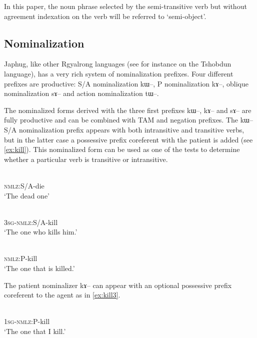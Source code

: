 \documentclass[oldfontcommands,oneside,a4paper,11pt]{article}
\newcommand{\ipa}[1]{{\phon #1}} %
\begin{document}
In this paper, the noun phrase selected by the semi-transitive verb but without agreement indexation on the verb will be referred to `semi-object'.

\subsection{Nominalization} \label{sec:nmlz}

Japhug, like other Rgyalrong languages (see for instance \citealt{jackson03caodeng} on the Tshobdun language), has a very rich system of nominalization prefixes. Four different prefixes are productive:   S/A nominalization \ipa{kɯ--},   P nominalization \ipa{kɤ--},   oblique nominalization \ipa{sɤ--}  and   action nominalization \ipa{tɯ--}.  

 
The nominalized forms derived with the three first prefixes \ipa{kɯ--}, \ipa{kɤ}-- and \ipa{sɤ}-- are fully productive and can be combined with TAM and negation prefixes.  The \ipa{kɯ--} S/A nominalization prefix appears with both intransitive and transitive verbs, but in the latter case a possessive prefix  coreferent with the patient is added (see \ref{ex:kill}). This nominalized form can be used as one of the tests to determine whether a particular verb is transitive or intransitive.  

 \begin{exe}
\ex
\gll \ipa{kɯ-si}    \\
  \textsc{nmlz}:S/A-die \\
 \glt  `The dead one'
 
\ex \label{ex:kill}
\gll \ipa{ɯ-kɯ-sat}    \\
  \textsc{3sg}-\textsc{nmlz}:S/A-kill \\
 \glt  `The one who kills him.'
 

\ex \label{ex:kill2}
\gll \ipa{kɤ-sat}    \\
   \textsc{nmlz}:P-kill \\
 \glt  `The one that is killed.'
 \end{exe}
 
  The patient nominalizer \ipa{kɤ--} can appear with an optional possessive prefix coreferent to the agent as in \ref{ex:kill3}.
  
  \begin{exe}
\ex \label{ex:kill3}
\gll \ipa{a-kɤ-sat}    \\
   \textsc{1sg-nmlz}:P-kill \\
 \glt  `The one that I kill.'
 \end{exe}
\end{document}
